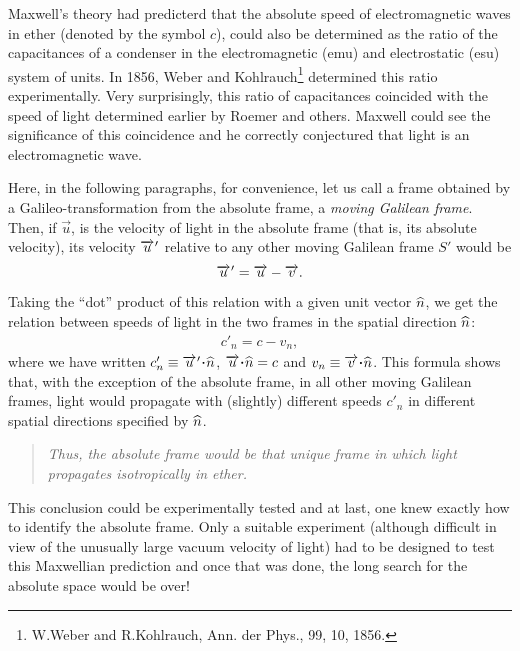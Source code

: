 Maxwell's  theory had predicterd that the absolute speed 
of electromagnetic waves in ether (denoted by the symbol 
$c$), could also be determined as the ratio of the 
capacitances of a condenser in the electromagnetic (emu) and 
electrostatic (esu) system of units.  In 1856, Weber and 
Kohlrauch\footnote{W.Weber and R.Kohlrauch, {Ann. der 
Phys}., {99}, 10, 1856.} determined this ratio 
experimentally. Very surprisingly, this ratio of 
capacitances coincided with the speed of light determined 
earlier by Roemer and others.  Maxwell could see the 
significance of this coincidence and he correctly 
conjectured that light is an electromagnetic wave. 

Here, in the following paragraphs, for convenience, let us 
call a frame obtained by a Galileo-transformation from the 
absolute frame, a \textsl{moving Galilean frame}. 
Then, if $\vec{u}$, is the 
velocity of light in the absolute frame (that is, its absolute 
velocity), its velocity ${\overrightarrow{u}\hspace*{.3pt}'}$ relative to any other 
moving Galilean frame $S'$ would be
\begin{align}\label{sav.1}
{\ensuremath{\overrightarrow{u}\hspace*{.3pt}'}}=\overrightarrow{u}-\overrightarrow{v}.
\end{align}
Taking the ``dot'' product of this relation with a given 
unit vector ${\widehat{n}}$, we get the relation between speeds 
of light in the two frames in the spatial 
direction ${\widehat{n}}$:
\begin{align*}
c'_n=c-v_n,
\end{align*}
where we have written  $c'_n\equiv \pvec{u}\dotp \uvec{n}$,
$\vec{u}\dotp \uvec{n} = c$ and $v_n\equiv \vec{v}\dotp 
\uvec{n}$. This formula shows that, with the exception of 
the absolute frame, in all other moving Galilean frames, 
light would propagate with (slightly) different speeds 
$c'_n$ in different spatial directions specified by 
${\widehat{n}}$. 
\begin{quote}
\textsl{Thus, the absolute frame would be that unique frame 
in which light propagates isotropically in ether.}          
\end{quote}

This conclusion could be experimentally tested and at last, 
one knew exactly how to identify the absolute frame. Only a 
suitable experiment (although difficult in view of the 
unusually large vacuum velocity of light) had to be designed 
to test this Maxwellian prediction and once that was done, 
the long search for the absolute space would be over!


